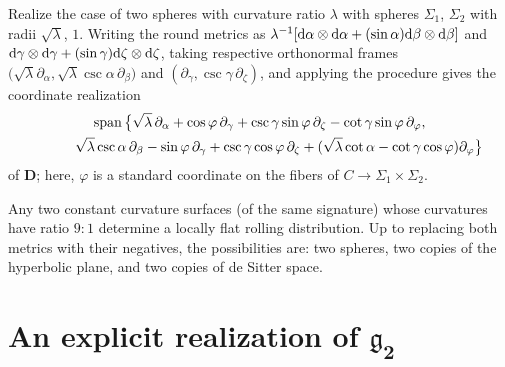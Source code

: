 \documentclass[10pt,a4paper]{amsart}
\newcommand{\mbD}{\mathbf{D}}
\newcommand{\mfg} {\mathfrak{g}}
\numberwithin{equation}{section}
\begin{document}
\begin{Example}\label{example:two-spheres}
Realize the case of two spheres with curvature ratio $\lambda$ with spheres $\Sigma_1$, $\Sigma_2$ with radii $\sqrt{\lambda}$, $1$. Writing the round metrics as $\lambda^{-1} [{\rm d}\alpha \otimes {\rm d}\alpha + (\sin \alpha) {\rm d}\beta \otimes {\rm d}\beta]$ and ${\rm d}\gamma \otimes {\rm d}\gamma + (\sin \gamma) {\rm d}\zeta \otimes {\rm d}\zeta$, taking respective orthonormal frames $\big(\sqrt{\lambda} \partial_{\alpha}, \sqrt{\lambda} \csc \alpha \,\partial_{\beta}\big)$ and $(\partial_{\gamma}, \csc \gamma \,\partial_{\zeta})$, and applying the procedure gives the coordinate realization
\begin{gather*}
		\operatorname{span}\big\{
			\sqrt\lambda \,\partial_{\alpha}
				+ \cos \varphi \,\partial_{\gamma}
				+ \csc \gamma \sin \varphi \,\partial_{\zeta}
				- \cot \gamma \sin \varphi \,\partial_{\varphi}, \\
\hphantom{\operatorname{span}\big\{}{}\sqrt\lambda \csc \alpha \,\partial_{\beta}
				- \sin \varphi \,\partial_{\gamma}
				+ \csc \gamma \cos \varphi \,\partial_{\zeta}
				+ (\sqrt\lambda \cot \alpha - \cot \gamma \cos \varphi) \partial_{\varphi}
		\big\}
\end{gather*}
of $\mbD$; here, $\varphi$ is a standard coordinate on the fibers of $C \to \Sigma_1 \times \Sigma_2$.
\end{Example}

\begin{Remark}
Any two constant curvature surfaces (of the same signature) whose curvatures have ratio $9:1$ determine a locally flat rolling distribution. Up to replacing both metrics with their negatives, the possibilities are: two spheres, two copies of the hyperbolic plane, and two copies of de Sitter space.
\end{Remark}


\appendix
\appendixpage
\section[An explicit realization of $\mfg_2$]{An explicit realization of $\boldsymbol{\mfg_2}$}\label{appendix:tables}
\end{document}

